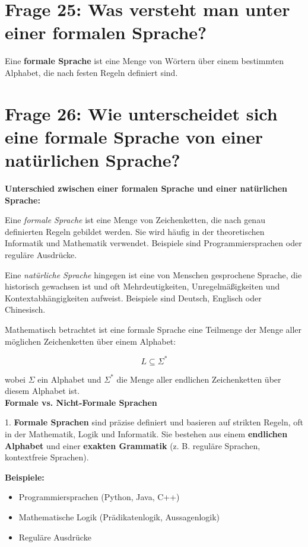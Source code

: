 \documentclass{article}
\begin{document}
\section*{Frage 25: Was versteht man unter einer formalen Sprache?}
Eine \textbf{formale Sprache} ist eine Menge von Wörtern über einem bestimmten Alphabet, die nach festen Regeln definiert sind.

\section*{Frage 26: Wie unterscheidet sich eine formale Sprache von einer natürlichen Sprache?}
\textbf{Unterschied zwischen einer formalen Sprache und einer natürlichen Sprache:}

Eine \emph{formale Sprache} ist eine Menge von Zeichenketten, die nach genau definierten Regeln gebildet werden. Sie wird häufig in der theoretischen Informatik und Mathematik verwendet. Beispiele sind Programmiersprachen oder reguläre Ausdrücke.

Eine \emph{natürliche Sprache} hingegen ist eine von Menschen gesprochene Sprache, die historisch gewachsen ist und oft Mehrdeutigkeiten, Unregelmäßigkeiten und Kontextabhängigkeiten aufweist. Beispiele sind Deutsch, Englisch oder Chinesisch.

Mathematisch betrachtet ist eine formale Sprache eine Teilmenge der Menge aller möglichen Zeichenketten über einem Alphabet:

\[
L \subseteq \Sigma^*
\]

wobei \(\Sigma\) ein Alphabet und \(\Sigma^*\) die Menge aller endlichen Zeichenketten über diesem Alphabet ist. \\

	\textbf{Formale vs. Nicht-Formale Sprachen}

1. \textbf{Formale Sprachen} sind präzise definiert und basieren auf strikten Regeln, oft in der Mathematik, Logik und Informatik. Sie bestehen aus einem \textbf{endlichen Alphabet} und einer \textbf{exakten Grammatik} (z. B. reguläre Sprachen, kontextfreie Sprachen).

\textbf{Beispiele:}
\begin{itemize}
	\item Programmiersprachen (Python, Java, C++)
	\item Mathematische Logik (Prädikatenlogik, Aussagenlogik)
	\item Reguläre Ausdrücke
\end{itemize}
\end{document}
